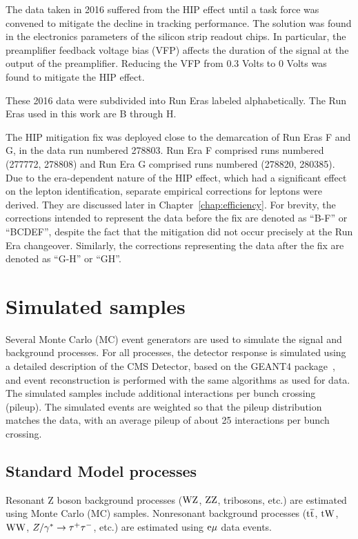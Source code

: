 The data taken in 2016 suffered from the HIP effect until a task force was
convened to mitigate the decline in tracking performance.
The solution was found in the electronics parameters of the silicon strip readout chips.
In particular, the preamplifier feedback voltage bias (VFP) affects the duration
of the signal at the output of the preamplifier.
Reducing the VFP from 0.3 Volts to 0 Volts was found to mitigate the HIP effect. 

These 2016 data were subdivided into Run Eras labeled alphabetically.
The Run Eras used in this work are B through H. 

The HIP mitigation fix was deployed close to the demarcation of Run Eras F and G,
in the data run numbered 278803.
Run Era F comprised runs numbered (277772, 278808) and Run Era G comprised runs numbered (278820, 280385).
Due to the era-dependent nature of the HIP effect, which had a significant effect on the lepton identification, 
separate empirical corrections for leptons were derived.
They are discussed later in Chapter~\ref{chap:efficiency}.
For brevity, the corrections intended to represent the data before the fix are denoted as
``B-F'' or ``BCDEF'', despite the fact that the mitigation did not occur precisely at the Run Era changeover.
Similarly, the corrections representing the data after the fix are denoted as ``G-H'' or ``GH''.

\section{Simulated samples}
\label{sec:mcsamples}
Several Monte Carlo (MC) event generators are used to simulate the signal and
background processes. For all processes, the detector response is simulated using a detailed
description of the CMS Detector, based on the \textsc{GEANT4} 
package~\cite{Agostinelli:2002hh}, and event reconstruction is performed with
the same algorithms as used for data.
The simulated samples include additional interactions per bunch crossing (pileup).
The simulated events are weighted so that the pileup distribution matches the data,
with an average pileup of about 25 interactions per bunch crossing.

\subsection{Standard Model processes}
Resonant Z boson background processes ($\mathrm{W}\mathrm{Z}$, $\mathrm{Z}\mathrm{Z}$, tribosons, etc.) are
estimated using Monte Carlo (MC) samples. Nonresonant background processes
(${\mathrm{t}\overline{\mathrm{t}}}$, $\mathrm{tW}$, $\mathrm{W}\mathrm{W}$, $Z/\gamma^*\to\tau^+\tau^-$, etc.) are estimated using $\mathrm{e}\mu$ data events.

